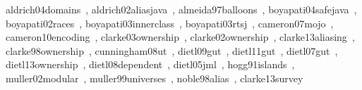 \documentclass{acm_proc_article-sp}
\begin{document}
aldrich04domains~\cite{aldrich04domains},\newline
aldrich02aliasjava~\cite{aldrich02aliasjava},\newline
almeida97balloons~\cite{almeida97balloons},\newline
boyapati04safejava~\cite{boyapati04safejava},\newline
boyapati02races~\cite{boyapati02races},\newline
boyapati03innerclass~\cite{boyapati03innerclass},\newline
boyapati03rtsj~\cite{boyapati03rtsj},\newline
cameron07mojo~\cite{cameron07mojo},\newline
cameron10encoding~\cite{cameron10encoding},\newline
clarke03ownership~\cite{clarke03ownership},\newline
clarke02ownership~\cite{clarke02ownership},\newline
clarke13aliasing~\cite{clarke13aliasing},\newline
clarke98ownership~\cite{clarke98ownership},\newline
cunningham08ut~\cite{cunningham08ut},\newline
dietl09gut~\cite{dietl09gut},\newline
dietl11gut~\cite{dietl11gut},\newline
dietl07gut~\cite{dietl07gut},\newline
dietl13ownership~\cite{dietl13ownership},\newline
dietl08dependent~\cite{dietl08dependent},\newline
dietl05jml~\cite{dietl05jml},\newline
hogg91islands~\cite{hogg91islands},\newline
muller02modular~\cite{muller02modular},\newline
muller99universes~\cite{muller99universes},\newline
noble98alias~\cite{noble98alias}, \newline
clarke13survey~\cite{clarke13survey}





\end{document}
